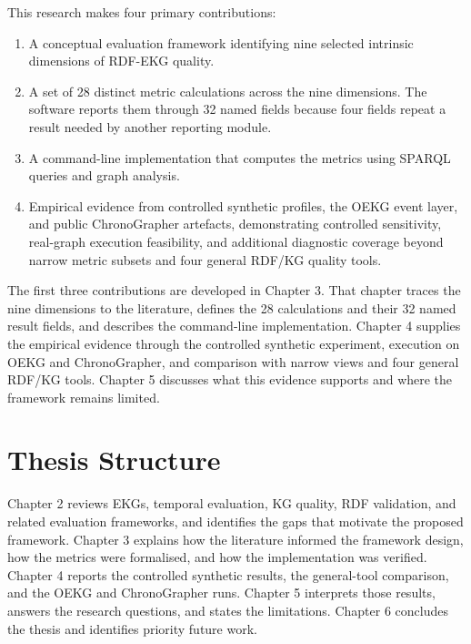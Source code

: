 This research makes four primary contributions:

\begin{enumerate}
    \item A conceptual evaluation framework identifying nine selected intrinsic dimensions of RDF-EKG quality.
    \item A set of 28 distinct metric calculations across the nine dimensions. The software reports them through 32 named fields because four fields repeat a result needed by another reporting module.
    \item A command-line implementation that computes the metrics using SPARQL queries and graph analysis.
    \item Empirical evidence from controlled synthetic profiles, the OEKG event layer, and public ChronoGrapher artefacts, demonstrating controlled sensitivity, real-graph execution feasibility, and additional diagnostic coverage beyond narrow metric subsets and four general RDF/KG quality tools.
\end{enumerate}

The first three contributions are developed in Chapter 3. That chapter traces the nine dimensions to the literature, defines the 28 calculations and their 32 named result fields, and describes the command-line implementation. Chapter 4 supplies the empirical evidence through the controlled synthetic experiment, execution on OEKG and ChronoGrapher, and comparison with narrow views and four general RDF/KG tools. Chapter 5 discusses what this evidence supports and where the framework remains limited.

\section{Thesis Structure}

Chapter 2 reviews EKGs, temporal evaluation, KG quality, RDF validation, and related evaluation frameworks, and identifies the gaps that motivate the proposed framework. Chapter 3 explains how the literature informed the framework design, how the metrics were formalised, and how the implementation was verified. Chapter 4 reports the controlled synthetic results, the general-tool comparison, and the OEKG and ChronoGrapher runs. Chapter 5 interprets those results, answers the research questions, and states the limitations. Chapter 6 concludes the thesis and identifies priority future work.

